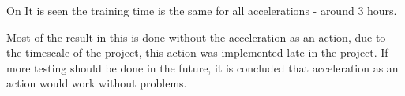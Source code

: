On  It is seen the training time is the same for all accelerations - around 3 hours. 

Most of the result in this  is done without the acceleration as an action, due to the timescale of the project, this action was implemented late in the project. If more testing should be done in the future, it is concluded that acceleration as an action would work without problems.   